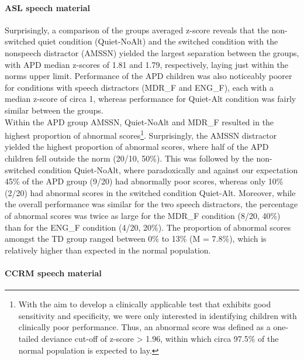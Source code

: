 \documentclass[a4paper, twoside]{templates/ociamthesis}
\begin{document}
\hypertarget{asl-speech-material}{%
\paragraph*{ASL speech material}\label{asl-speech-material}}

\hfill\break
Surprisingly, a comparison of the groups averaged z-score reveals that the non-switched quiet condition (Quiet-NoAlt) and the switched condition with the nonspeech distractor (AMSSN) yielded the largest separation between the groups, with APD median z-scores of 1.81 and 1.79, respectively, laying just within the norms upper limit. Performance of the APD children was also noticeably poorer for conditions with speech distractors (MDR\_F and ENG\_F), each with a median z-score of circa 1, whereas performance for Quiet-Alt condition was fairly similar between the groups.\\

Within the APD group AMSSN, Quiet-NoAlt and MDR\_F resulted in the highest proportion of abnormal scores\footnote{With the aim to develop a clinically applicable test that exhibits good sensitivity and specificity, we were only interested in identifying children with clinically poor performance. Thus, an abnormal score was defined as a one-tailed deviance cut-off of z-score \textgreater{} 1.96, within which circa 97.5\% of the normal population is expected to lay.}. Surprisingly, the AMSSN distractor yielded the highest proportion of abnormal scores, where half of the APD children fell outside the norm (20/10, 50\%). This was followed by the non-switched condition Quiet-NoAlt, where paradoxically and against our expectation 45\% of the APD group (9/20) had abnormally poor scores, whereas only 10\% (2/20) had abnormal scores in the switched condition Quiet-Alt. Moreover, while the overall performance was similar for the two speech distractors, the percentage of abnormal scores was twice as large for the MDR\_F condition (8/20, 40\%) than for the ENG\_F condition (4/20, 20\%). The proportion of abnormal scores amongst the TD group ranged between 0\% to 13\% (M = 7.8\%), which is relatively higher than expected in the normal population.\\

\hypertarget{ccrm-speech-material}{%
\paragraph*{CCRM speech material}\label{ccrm-speech-material}}
\end{document}
